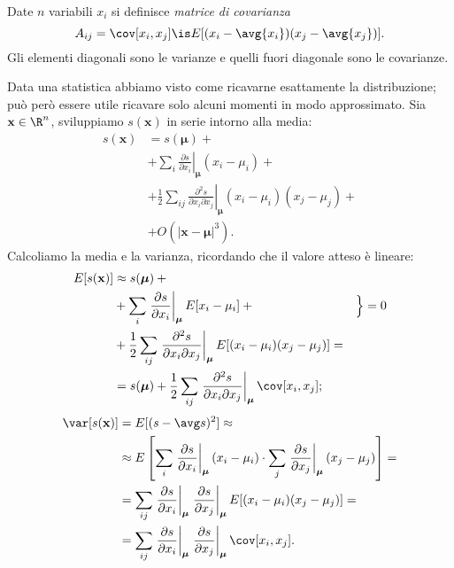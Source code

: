 
\begin{definition}
	Date $n$ variabili $x_i$ si definisce \emph{matrice di covarianza}
	\begin{equation*}
		A_{ij} = \cov[x_i,x_j] \is E[(x_i-\avg{x_i})(x_j-\avg{x_j})].
	\end{equation*}
	Gli elementi diagonali sono le varianze e quelli fuori diagonale sono le covarianze.
\end{definition}

Data una statistica abbiamo visto come ricavarne esattamente la distribuzione;
può però essere utile ricavare solo alcuni momenti in modo approssimato.
Sia $\mathbf x\in\R^n$, sviluppiamo $s(\mathbf x)$ in serie intorno alla media:
\begin{align*}
	s(\mathbf x) &= s(\boldsymbol \mu) + {}\\
	&+ \sum_i \left.\frac{\partial s}{\partial x_i}\right|_{\boldsymbol\mu} (x_i - \mu_i) + {}\\
	&+ \frac12 \sum_{ij} \left.\frac{\partial^2 s}{\partial x_i \partial x_j}\right|_{\boldsymbol\mu} (x_i-\mu_i)(x_j-\mu_j) + {}\\
	&+ O(|\mathbf x - \boldsymbol\mu|^3).
\end{align*}
Calcoliamo la media e la varianza, ricordando che il valore atteso è lineare:
\begin{align*}
	E[s(\mathbf x)] &\approx s(\boldsymbol \mu) + {}\\
	&+ \sum_i \left.\frac{\partial s}{\partial x_i}\right|_{\boldsymbol\mu} E[x_i - \mu_i] + {} & \Big\} = 0\\
	&+ \frac12 \sum_{ij} \left.\frac{\partial^2 s}{\partial x_i \partial x_j}\right|_{\boldsymbol\mu} E[(x_i-\mu_i)(x_j-\mu_j)] = \\
	&= s(\boldsymbol \mu) +
	\frac12 \sum_{ij} \left.\frac{\partial^2 s}{\partial x_i \partial x_j}\right|_{\boldsymbol\mu}
	\cov[x_i,x_j];
\end{align*}
\begin{align*}
	\var[s(\mathbf x)] &= E[(s - \avg s)^2] \approx \\
	&\approx E\left[
	\sum_i \left.\frac{\partial s}{\partial x_i}\right|_{\boldsymbol\mu} (x_i - \mu_i) \cdot
	\sum_j \left.\frac{\partial s}{\partial x_j}\right|_{\boldsymbol\mu} (x_j - \mu_j) \right] = \\
	&= \sum_{ij}
	\left.\frac{\partial s}{\partial x_i}\right|_{\boldsymbol\mu}
	\left.\frac{\partial s}{\partial x_j}\right|_{\boldsymbol\mu}
	E[ (x_i - \mu_i) (x_j - \mu_j) ] = \\
	&= \sum_{ij}
	\left.\frac{\partial s}{\partial x_i}\right|_{\boldsymbol\mu}
	\left.\frac{\partial s}{\partial x_j}\right|_{\boldsymbol\mu}
	\cov[x_i,x_j].
\end{align*}
